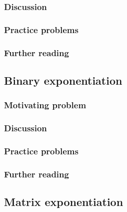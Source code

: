
\subsubsection*{Discussion}

\subsubsection*{Practice problems}

\subsubsection*{Further reading}

\subsection{Binary exponentiation}

\subsubsection*{Motivating problem}







\subsubsection*{Discussion}

\subsubsection*{Practice problems}

\subsubsection*{Further reading}

\subsection{Matrix exponentiation}

